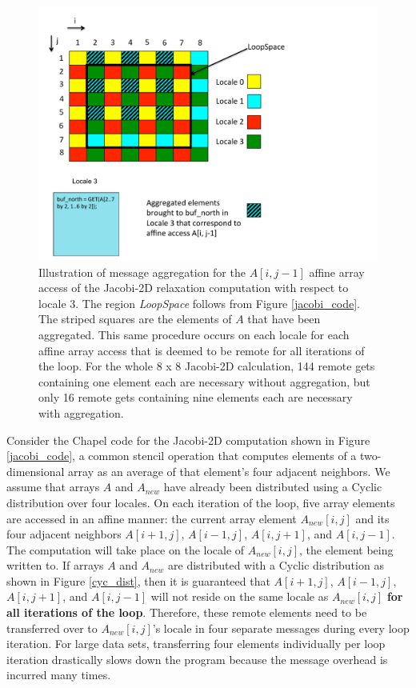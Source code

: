 \begin{figure}
\begin{center}
\includegraphics[width=\linewidth]{./Figures/aggregation}
\caption{Illustration of message aggregation for the $A[i, j-1]$ affine array access of the Jacobi-2D relaxation computation with respect to locale 3. The region \textit{LoopSpace} follows from Figure \ref{jacobi_code}. The striped squares are the elements of $A$ that have been aggregated. This same procedure occurs on each locale for each affine array access that is deemed to be remote for all iterations of the loop. For the whole 8 x 8 Jacobi-2D calculation, 144 remote gets containing one element each are necessary without aggregation, but only 16 remote gets containing nine elements each are necessary with aggregation.}
\label{aggregation}
\end{center}
\end{figure}

Consider the Chapel code for the Jacobi-2D computation shown in Figure \ref{jacobi_code}, a common stencil operation that computes elements of a two-dimensional array as an average of that element's four adjacent neighbors. We assume that arrays $A$ and $A_{new}$ have already been distributed using a Cyclic distribution over four locales. On each iteration of the loop, five array elements are accessed in an affine manner: the current array element $A_{new}[i, j]$ and its four adjacent neighbors $A[i+1, j]$, $A[i-1, j]$, $A[i, j+1]$, and $A[i, j-1]$. The computation will take place on the locale of $A_{new}[i, j]$, the element being written to. If arrays $A$ and $A_{new}$ are distributed with a Cyclic distribution as shown in Figure \ref{cyc_dist}, then it is guaranteed that $A[i+1, j]$, $A[i-1, j]$, $A[i, j+1]$, and $A[i, j-1]$ will not reside on the same locale as $A_{new}[i, j]$ \textbf{for all iterations of the loop}. Therefore, these remote elements need to be transferred over to $A_{new}[i, j]$'s locale in four separate messages during every loop iteration. For large data sets, transferring four elements individually per loop iteration drastically slows down the program because the message overhead is incurred many times. 

